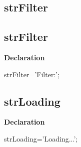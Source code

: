 \documentclass{report}
\newif\ifpdf
\begin{document}
\subsection*{\large{\textbf{strFilter}}\normalsize\hspace{1ex}\hrulefill}
\else
\subsection*{strFilter}
\fi
\label{trstrings-strFilter}
\begin{list}{}{
\setlength{\itemindent}{0cm}
\setlength{\listparindent}{0cm}
\setlength{\leftmargin}{\evensidemargin}
\addtolength{\leftmargin}{\tmplength}
\settowidth{\labelsep}{X}
\addtolength{\leftmargin}{\labelsep}
\setlength{\labelwidth}{\tmplength}
}
\item[\textbf{Declaration}\hfill]
\ifpdf
\begin{flushleft}
\fi
\begin{ttfamily}
strFilter='Filter:';\end{ttfamily}

\ifpdf
\end{flushleft}
\fi

\end{list}
\ifpdf
\subsection*{\large{\textbf{strLoading}}\normalsize\hspace{1ex}\hrulefill}
\else
\subsection*{strLoading}
\fi
\label{trstrings-strLoading}
\begin{list}{}{
\setlength{\itemindent}{0cm}
\setlength{\listparindent}{0cm}
\setlength{\leftmargin}{\evensidemargin}
\addtolength{\leftmargin}{\tmplength}
\settowidth{\labelsep}{X}
\addtolength{\leftmargin}{\labelsep}
\setlength{\labelwidth}{\tmplength}
}
\item[\textbf{Declaration}\hfill]
\ifpdf
\begin{flushleft}
\fi
\begin{ttfamily}
strLoading='Loading...';\end{ttfamily}

\ifpdf
\end{flushleft}
\fi

\end{list}
\ifpdf
\end{document}
